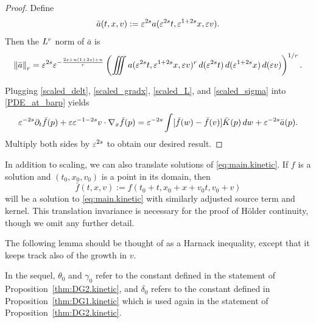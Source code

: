 \begin{proof}
Define
\begin{equation}\label{scaled_sigma}
\bar{a}(t,x,v) := \varepsilon^{2s} a(\varepsilon^{2s} t, \varepsilon^{1+2s} x, \varepsilon v). 
\end{equation}
Then the $L^{r}$ norm of $\bar{a}$ is
\[ \left\lVert\bar{a}\right\rVert_{r} = \varepsilon^{2s} \varepsilon^{-\frac{2s + n(1+2s) + n}{{r}}} \left( \iiint a(\varepsilon^{2s} t, \varepsilon^{1+2s} x, \varepsilon v)^{r} \,d(\varepsilon^{2s} t)\, d(\varepsilon^{1+2s} x) \, d(\varepsilon v) \right)^{1/{r}}. \]

Plugging \eqref{scaled_delt}, \eqref{scaled_gradx}, \eqref{scaled_L}, and \eqref{scaled_sigma} into \eqref{PDE_at_barp} yields
\[ \varepsilon^{-2s} \partial_t \bar{f}(p) + \varepsilon \varepsilon^{-1-2s} v\cdot\nabla_x \bar{f}(p) = \varepsilon^{-2s} \int [\bar{f}(w)-\bar{f}(v)] \bar{K}(p) \,dw + \varepsilon^{-2s} \bar{a}(p). \]
Multiply both sides by $\varepsilon^{2s}$ to obtain our desired result.  
\end{proof}

\begin{remark}
In addition to scaling, we can also translate solutions of \eqref{eq:main.kinetic}.  If $f$ is a solution and $(t_0,x_0,v_0)$ is a point in its domain, then
\[ \bar{f}(t,x,v) := f(t_0 + t, x_0 + x + v_0 t, v_0 + v) \]
will be a solution to \eqref{eq:main.kinetic} with similarly adjusted source term and kernel.  This translation invariance is necessary for the proof of H\"{o}lder continuity, though we omit any further detail.  
\end{remark}

The following lemma should be thought of as a Harnack inequality, except that it keeps track also of the growth in $v$.  

In the sequel, $\theta_0$ and $\gamma_0$ refer to the constant defined in the statement of Proposition~\ref{thm:DG2.kinetic}, and $\delta_0$ refers to the constant defined in Proposition~\ref{thm:DG1.kinetic} which is used again in the statement of Proposition~\ref{thm:DG2.kinetic}.

